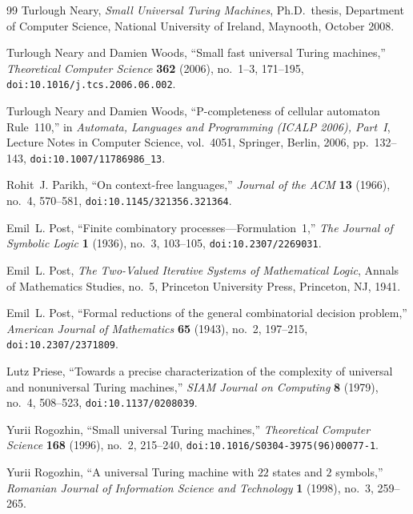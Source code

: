 \documentclass[11pt,reqno]{amsart}
\numberwithin{equation}{section}
\theoremstyle{plain}
\theoremstyle{definition}
\theoremstyle{remark}
\begin{document}
\begin{thebibliography}{99}
Turlough Neary,
\emph{Small Universal Turing Machines},
Ph.D.\ thesis, Department of Computer Science, National University of Ireland, Maynooth, October 2008.

Turlough Neary and Damien Woods,
``Small fast universal Turing machines,''
\emph{Theoretical Computer Science} \textbf{362} (2006), no.~1--3, 171--195,
\texttt{doi:10.1016/j.tcs.2006.06.002}.

Turlough Neary and Damien Woods,
``$\mathrm{P}$-completeness of cellular automaton Rule~110,''
in \emph{Automata, Languages and Programming (ICALP 2006), Part~I},
Lecture Notes in Computer Science, vol.~4051, Springer, Berlin, 2006, pp.~132--143,
\texttt{doi:10.1007/11786986\_13}.

Rohit~J. Parikh,
``On context-free languages,''
\emph{Journal of the ACM} \textbf{13} (1966), no.~4, 570--581,
\texttt{doi:10.1145/321356.321364}.

Emil~L. Post,
``Finite combinatory processes---Formulation~1,''
\emph{The Journal of Symbolic Logic} \textbf{1} (1936), no.~3, 103--105,
\texttt{doi:10.2307/2269031}.

Emil~L. Post,
\emph{The Two-Valued Iterative Systems of Mathematical Logic},
Annals of Mathematics Studies, no.~5, Princeton University Press, Princeton, NJ, 1941.

Emil~L. Post,
``Formal reductions of the general combinatorial decision problem,''
\emph{American Journal of Mathematics} \textbf{65} (1943), no.~2, 197--215,
\texttt{doi:10.2307/2371809}.

Lutz Priese,
``Towards a precise characterization of the complexity of universal and nonuniversal Turing machines,''
\emph{SIAM Journal on Computing} \textbf{8} (1979), no.~4, 508--523,
\texttt{doi:10.1137/0208039}.

Yurii Rogozhin,
``Small universal Turing machines,''
\emph{Theoretical Computer Science} \textbf{168} (1996), no.~2, 215--240,
\texttt{doi:10.1016/S0304-3975(96)00077-1}.

Yurii Rogozhin,
``A universal Turing machine with $22$ states and $2$ symbols,''
\emph{Romanian Journal of Information Science and Technology} \textbf{1} (1998), no.~3, 259--265.


\end{thebibliography}
\end{document}
